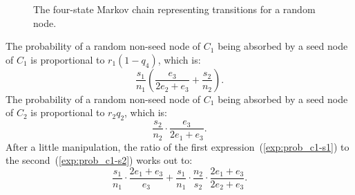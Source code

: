 \begin{figure}[t]
\begin{center}
\end{center}
\caption{The four-state Markov chain representing transitions for a random node.}
\label{fig:4stateMC}
\end{figure}

The probability of a random non-seed node of $C_1$ being absorbed by a 
seed node of $C_1$ is proportional to $r_1 (1 - q_4)$, which is: 
\begin{equation}\label{exp:prob_c1-s1}
    \frac{s_1}{n_1} \left ( \frac{e_3}{2e_2 + e_3} + \frac{s_2}{n_2} \right ).
\end{equation}
The probability of a random non-seed node of $C_1$ being absorbed by 
a seed node of $C_2$ is proportional to $r_2 q_2$, which is: 
\begin{equation}\label{exp:prob_c1-s2}
    \frac{s_2}{n_2} \cdot \frac{e_3}{2e_1 + e_3}.
\end{equation}
After a little manipulation, the ratio of the first expression~(\ref{exp:prob_c1-s1}) 
to the second~(\ref{exp:prob_c1-s2}) works out to:
\begin{equation} \label{exp:final_ratio}
    \frac{s_1}{n_1} \cdot \frac{2e_1 + e_3}{e_3} + 
    \frac{s_1}{n_1} \cdot \frac{n_2}{s_2} \cdot 
            \frac{2e_1 + e_3}{2e_2 + e_3}.
\end{equation}

